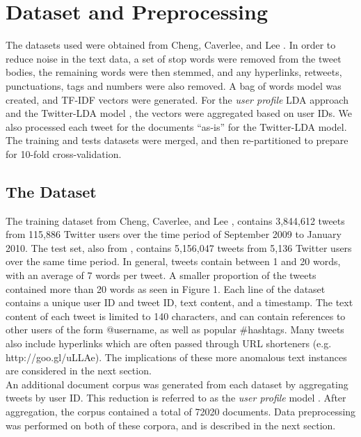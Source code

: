 \documentclass{acm_proc_article-sp}
\begin{document}
\section{Dataset and Preprocessing}
\hspace*{5mm}The datasets used were obtained from Cheng, Caverlee, and Lee \cite{cheng2010content}. In order to reduce noise in the text data, a set of stop words were removed from the tweet bodies, the remaining words were then stemmed, and any hyperlinks, retweets, punctuations, tags and numbers were also removed. A bag of words model was created, and TF-IDF vectors were generated. For the \textit{user profile} LDA approach \cite{hong2010empirical} and the Twitter-LDA model \cite{zhao2011comparing}, the vectors were aggregated based on user IDs. We also processed each tweet for the documents ``as-is'' for the Twitter-LDA model. The training and tests datasets were merged, and then re-partitioned to prepare for 10-fold cross-validation.\\


\subsection{The Dataset} 
\hspace*{5mm}The training dataset from Cheng, Caverlee, and Lee \cite{cheng2010content}, contains 3,844,612 tweets from 115,886 Twitter users over the time period of September 2009 to January 2010. The test set, also from \cite{cheng2010content}, contains 5,156,047 tweets from 5,136 Twitter users over the same time period. In general, tweets contain between 1 and 20 words, with an average of 7 words per tweet. A smaller proportion of the tweets contained more than 20 words as seen in Figure 1. Each line of the dataset contains a unique user ID and tweet ID, text content, and a timestamp. The text content of each tweet is limited to 140 characters, and can contain references to other users of the form @username, as well as popular \#hashtags. Many tweets also include hyperlinks which are often passed through URL shorteners (e.g. http://goo.gl/uLLAe). The implications of these more anomalous text instances are considered in the next section.\\
\hspace*{5mm}An additional document corpus was generated from each dataset by aggregating tweets by user ID. This reduction is referred to as the \textit{user profile} model \cite{hong2010empirical}. After aggregation, the corpus contained a total of 72020 documents. Data preprocessing was performed on both of these corpora, and is described in the next section.\\
 
\end{document}
